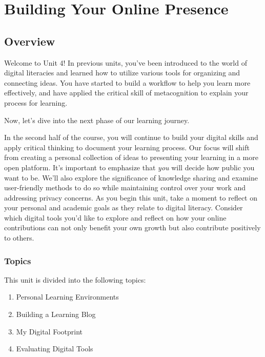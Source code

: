 \documentclass[
]{book}
\providecommand{\tightlist}{%
  \setlength{\itemsep}{0pt}\setlength{\parskip}{0pt}}
\theoremstyle{definition}
\theoremstyle{definition}
\theoremstyle{definition}
\theoremstyle{definition}
\theoremstyle{remark}
\begin{document}
\hypertarget{building-your-online-presence}{%
\chapter{Building Your Online Presence}\label{building-your-online-presence}}

\hypertarget{overview-3}{%
\section*{Overview}\label{overview-3}}

Welcome to Unit 4! In previous units, you've been introduced to the world of digital literacies and learned how to utilize various tools for organizing and connecting ideas. You have started to build a workflow to help you learn more effectively, and have applied the critical skill of metacognition to explain your process for learning.

Now, let's dive into the next phase of our learning journey.

In the second half of the course, you will continue to build your digital skills and apply critical thinking to document your learning process. Our focus will shift from creating a personal collection of ideas to presenting your learning in a more open platform. It's important to emphasize that \emph{you} will decide how public you want to be. We'll also explore the significance of knowledge sharing and examine user-friendly methods to do so while maintaining control over your work and addressing privacy concerns. As you begin this unit, take a moment to reflect on your personal and academic goals as they relate to digital literacy. Consider which digital tools you'd like to explore and reflect on how your online contributions can not only benefit your own growth but also contribute positively to others.

\hypertarget{topics-3}{%
\subsection*{Topics}\label{topics-3}}

This unit is divided into the following topics:

\begin{enumerate}
\def\labelenumi{\arabic{enumi}.}
\tightlist
\item
  Personal Learning Environments\\
\item
  Building a Learning Blog\\
\item
  My Digital Footprint\\
\item
  Evaluating Digital Tools
\end{enumerate}
\end{document}
